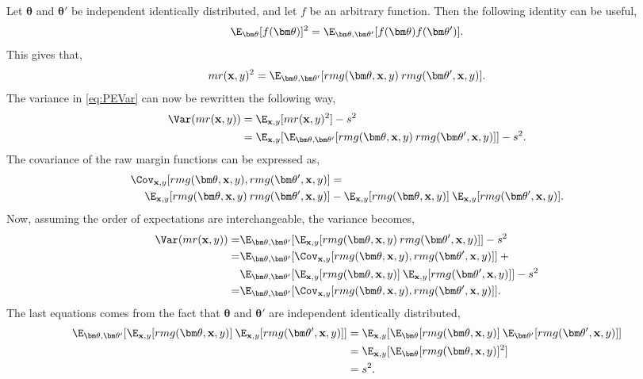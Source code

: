Let $\bm \theta$ and $\bm \theta'$ be independent identically distributed, and let $f$ be an arbitrary function. Then the following identity can be useful,
\begin{align}
  \E_{\bm \theta}[f(\bm \theta)]^2 = \E_{\bm \theta, \bm \theta'}[f(\bm \theta) f(\bm \theta')]. 
\end{align}
This gives that,
\begin{align}
  mr(\mathbf{x}, y)^2  = \E_{\bm \theta, \bm \theta'}[rmg(\bm \theta, \mathbf{x}, y) \: rmg(\bm \theta', \mathbf{x}, y)]. 
\end{align}
The variance in \eqref{eq:PEVar} can now be rewritten the following way,
\begin{align}
  \Var(mr(\mathbf{x}, y)) 
  &= \E_{\mathbf{x}, y}[mr(\mathbf{x}, y)^2] - s^2 \notag \\
  &= \E_{\mathbf{x}, y}[ \E_{\bm \theta, \bm \theta'}[rmg(\bm \theta, \mathbf{x}, y) \: rmg(\bm \theta', \mathbf{x}, y)]] - s^2.
\end{align}
The covariance of the raw margin functions can be expressed as,
\begin{align}
  \Cov_{\mathbf{x}, y} [rmg(\bm \theta, \mathbf{x}, y), rmg(\bm \theta', \mathbf{x}, y)] &= \notag \\
  \E_{\mathbf{x}, y} [rmg(\bm \theta, \mathbf{x}, y) \: rmg(\bm \theta', \mathbf{x}, y)] &-
  \E_{\mathbf{x}, y} [rmg(\bm \theta, \mathbf{x}, y)]\: \E_{\mathbf{x}, y} [rmg(\bm \theta', \mathbf{x}, y)].
\end{align}
Now, assuming the order of expectations are interchangeable, the variance becomes,
\begin{align}
  \Var(mr(\mathbf{x}, y)) 
  = &\E_{\bm \theta, \bm \theta'}[\E_{\mathbf{x}, y}[ rmg(\bm \theta, \mathbf{x}, y) \: rmg(\bm \theta', \mathbf{x}, y)]] - s^2 \notag \\
  = &\E_{\bm \theta, \bm \theta'}[\Cov_{\mathbf{x}, y} [rmg(\bm \theta, \mathbf{x}, y), rmg(\bm \theta', \mathbf{x}, y)]] \: +\notag \\
    &\E_{\bm \theta, \bm \theta'} [\E_{\mathbf{x}, y} [rmg(\bm \theta, \mathbf{x}, y)]\: \E_{\mathbf{x}, y} [rmg(\bm \theta', \mathbf{x}, y)]]
  - s^2 \notag \\
  \label{eq:VarCovRF} 
  = &\E_{\bm \theta, \bm \theta'}[\Cov_{\mathbf{x}, y} [rmg(\bm \theta, \mathbf{x}, y), rmg(\bm \theta', \mathbf{x}, y)]].
\end{align}
The last equations comes from the fact that $\bm \theta$ and $\bm \theta'$ are independent identically distributed,
\begin{align}
  \E_{\bm \theta, \bm \theta'} [\E_{\mathbf{x}, y} [rmg(\bm \theta, \mathbf{x}, y)]\: \E_{\mathbf{x}, y} [rmg(\bm \theta', \mathbf{x}, y)]] 
  &= \E_{\mathbf{x}, y} [\E_{\bm \theta} [rmg(\bm \theta, \mathbf{x}, y)] \: \E_{\bm \theta'}[rmg(\bm \theta', \mathbf{x}, y)]] \notag \\
  &= \E_{\mathbf{x}, y} [\E_{\bm \theta} [rmg(\bm \theta, \mathbf{x}, y)]^2]  \notag \\
  &= s^2.
\end{align}
